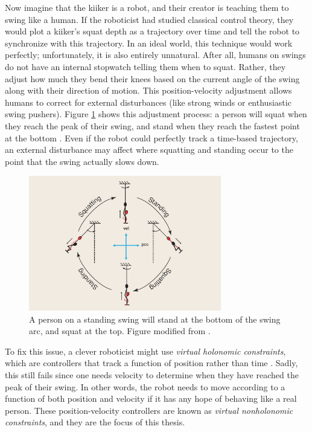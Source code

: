 Now imagine that the kiiker is a robot, and their creator is teaching them to
swing like a human.
If the roboticist had studied classical control theory, they would plot 
a kiiker's squat depth as a trajectory over time and tell the robot to
synchronize with this trajectory.
In an ideal world, this technique would work perfectly; unfortunately, it is
also entirely unnatural. 
After all, humans on swings do not have an internal stopwatch telling them when
to squat.
Rather, they adjust how much they bend their knees based on the current angle of
the swing along with their direction of motion.
This position-velocity adjustment allows humans to correct for external
disturbances (like strong winds or enthusiastic swing pushers). 
Figure \ref{fig:swing-pos-vel} shows this adjustment process:
a person will squat when they reach the peak of their swing, and
stand when they reach the fastest point at the bottom
\cite{pumping_swing_standing_squatting}.
Even if the robot could perfectly track a time-based trajectory, an external
disturbance may affect where squatting and standing occur to the point that
the swing actually slows down.

\begin{figure}
    \centering
    \includegraphics[width=0.75\textwidth]{images/swing_pos_vel.png}
    \caption{A person on a standing swing will stand at the bottom of the swing
        arc, and squat at the top. Figure modified from
        \cite{pumping_swing_standing_squatting}.}
    \label{fig:swing-pos-vel}
\end{figure}

To fix this issue, a clever roboticist might use \textit{virtual holonomic
constraints}, which are controllers that track a function of position rather
than time \cite{vhcs_for_el_systems}.
Sadly, this still fails since one needs velocity to determine when they
have reached the peak of their swing.
In other words, the robot needs to move according to a function of both position
and velocity if it has any hope of behaving like a real person.
These position-velocity controllers are known as 
\textit{virtual nonholonomic constraints}, and they are the focus of this
thesis.

